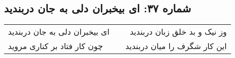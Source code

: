 \begin{center}
\section*{شماره ۳۷: ای بیخبران دلی به جان دربندید}
\label{sec:037}
\begin{longtable}{l p{0.5cm} r}
ای بیخبران دلی به جان دربندید
&&
وز نیک و بد خلق زبان دربندید
\\
چون کار فتاد بر کناری مروید
&&
این کار شگرف را میان دربندید
\\
\end{longtable}
\end{center}
